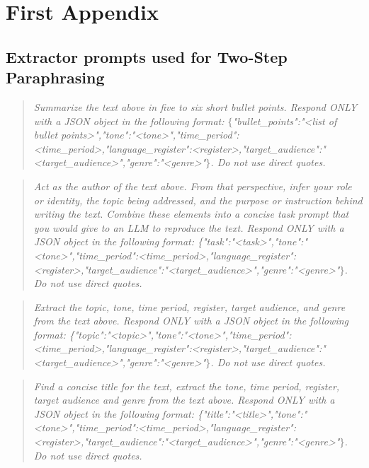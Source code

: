 \appendix
\chapter{First Appendix}
\label{ch:appendix}


\section{Extractor prompts used for Two-Step Paraphrasing}
\label{app:extractor_prompts}
\begin{quote}
    \textit{Summarize the text above in five to six short bullet points. Respond ONLY with a JSON object in the following format: $\{$"bullet\_points":"<list of bullet points>","tone":"<tone>","time\_period":<time\_period>,"language\_register":<register>,"target\_audience":"<target\_audience>","genre":"<genre>"$\}$. Do not use direct quotes.}
\end{quote}

\begin{quote}
    \textit{Act as the author of the text above. From that perspective, infer your role or identity, the topic being addressed, and the purpose or instruction behind writing the text. Combine these elements into a concise task prompt that you would give to an LLM to reproduce the text. Respond ONLY with a JSON object in the following format: \{"task":"<task>","tone":"<tone>","time\_period":<time\_period>,"language\_register":<register>,"target\_audience":"<target\_audience>","genre":"<genre>"$\}$. Do not use direct quotes.}
\end{quote}

\begin{quote}
    \textit{Extract the topic, tone, time period, register, target audience, and genre from the text above. Respond ONLY with a JSON object in the following format: \{"topic":"<topic>","tone":"<tone>","time\_period":<time\_period>,"language\_register":<register>,"target\_audience":"<target\_audience>","genre":"<genre>"$\}$. Do not use direct quotes.}
\end{quote}

\begin{quote}
    \textit{Find a concise title for the text, extract the tone, time period, register, target audience and genre from the text above. Respond ONLY with a JSON object in the following format: \{"title":"<title>","tone":"<tone>","time\_period":<time\_period>,"language\_register":<register>,"target\_audience":"<target\_audience>","genre":"<genre>"$\}$. Do not use direct quotes.}
\end{quote}

